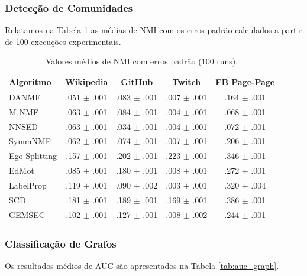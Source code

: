 \documentclass[sigconf]{acmart}
\begin{document}
\subsubsection{Detecção de Comunidades}

Relatamos na Tabela \ref{tab:nmi_node} as médias de NMI com os erros padrão calculados a partir de 100 execuções experimentais.

\begin{table}[h]
\centering
\caption{Valores médios de NMI com erros padrão (100 runs).}
\label{tab:nmi_node}
\small
\begin{tabular}{lcccc}
\toprule
Algoritmo & Wikipedia & GitHub & Twitch & FB Page-Page \\
\midrule
DANMF & .051 $\pm$ .001 & .083 $\pm$ .001 & .007 $\pm$ .001 & .164 $\pm$ .001 \\
M-NMF & .063 $\pm$ .001 & .084 $\pm$ .001 & .004 $\pm$ .001 & .068 $\pm$ .001 \\
NNSED & .063 $\pm$ .001 & .034 $\pm$ .001 & .004 $\pm$ .001 & .072 $\pm$ .001 \\
SymmNMF & .062 $\pm$ .001 & .074 $\pm$ .001 & .007 $\pm$ .001 & .206 $\pm$ .001 \\
Ego-Splitting & .157 $\pm$ .001 & .202 $\pm$ .001 & .223 $\pm$ .001 & .346 $\pm$ .001 \\
EdMot & .085 $\pm$ .001 & .180 $\pm$ .001 & .008 $\pm$ .001 & .272 $\pm$ .001 \\
LabelProp & .119 $\pm$ .001 & .090 $\pm$ .002 & .003 $\pm$ .001 & .320 $\pm$ .004 \\
SCD & .181 $\pm$ .001 & .189 $\pm$ .001 & .169 $\pm$ .001 & .386 $\pm$ .001 \\
GEMSEC & .102 $\pm$ .001 & .127 $\pm$ .001 & .008 $\pm$ .002 & .244 $\pm$ .001 \\
\bottomrule
\end{tabular}
\end{table}

\subsubsection{Classificação de Grafos}

Os resultados médios de AUC são apresentados na Tabela \ref{tab:auc_graph}.
\end{document}
